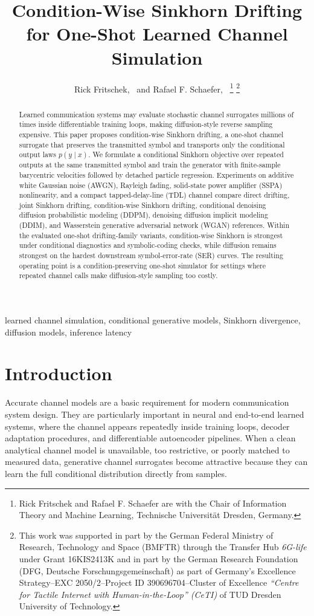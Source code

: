 \documentclass[10pt,journal]{IEEEtran}
\title{Condition-Wise Sinkhorn Drifting for One-Shot Learned Channel Simulation}
\author{Rick Fritschek,~\IEEEmembership{Member,~IEEE,} and Rafael F. Schaefer,~\IEEEmembership{Senior Member,~IEEE}%
\thanks{Rick Fritschek and Rafael F. Schaefer are with the Chair of Information Theory and Machine Learning, Technische Universit{\"a}t Dresden, Germany.}%
\thanks{This work was supported in part by the German Federal Ministry of Research, Technology and Space (BMFTR) through the Transfer Hub \emph{6G-life} under Grant 16KIS2413K and in part by the German Research Foundation (DFG, Deutsche Forschungsgemeinschaft) as part of Germany's Excellence Strategy--EXC 2050/2--Project ID 390696704--Cluster of Excellence \emph{``Centre for Tactile Internet with Human-in-the-Loop'' (CeTI)} of TUD Dresden University of Technology.}}
\begin{document}
\maketitle

\begin{abstract}
Learned communication systems may evaluate stochastic channel surrogates millions of times inside differentiable training loops, making diffusion-style reverse sampling expensive.
This paper proposes condition-wise Sinkhorn drifting, a one-shot channel surrogate that preserves the transmitted symbol and transports only the conditional output laws \(p(y\mid x)\).
We formulate a conditional Sinkhorn objective over repeated outputs at the same transmitted symbol and train the generator with finite-sample barycentric velocities followed by detached particle regression.
Experiments on additive white Gaussian noise (AWGN), Rayleigh fading, solid-state power amplifier (SSPA) nonlinearity, and a compact tapped-delay-line (TDL) channel compare direct drifting, joint Sinkhorn drifting, condition-wise Sinkhorn drifting, conditional denoising diffusion probabilistic modeling (DDPM), denoising diffusion implicit modeling (DDIM), and Wasserstein generative adversarial network (WGAN) references.
Within the evaluated one-shot drifting-family variants, condition-wise Sinkhorn is strongest under conditional diagnostics and symbolic-coding checks, while diffusion remains strongest on the hardest downstream symbol-error-rate (SER) curves.
The resulting operating point is a condition-preserving one-shot simulator for settings where repeated channel calls make diffusion-style sampling too costly.
\end{abstract}

\begin{IEEEkeywords}
learned channel simulation, conditional generative models, Sinkhorn divergence, diffusion models, inference latency
\end{IEEEkeywords}

\section{Introduction}
Accurate channel models are a basic requirement for modern communication system design.
They are particularly important in neural and end-to-end learned systems, where the channel appears repeatedly inside training loops, decoder adaptation procedures, and differentiable autoencoder pipelines.
When a clean analytical channel model is unavailable, too restrictive, or poorly matched to measured data, generative channel surrogates become attractive because they can learn the full conditional distribution directly from samples.
\end{document}
